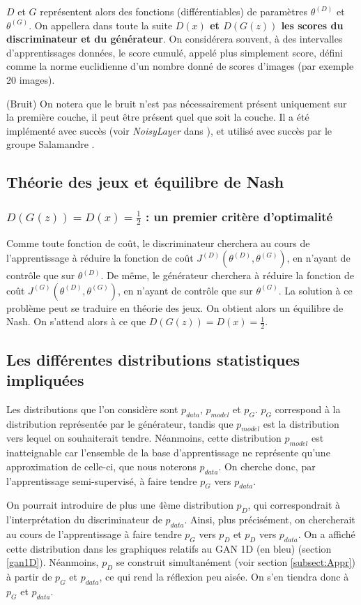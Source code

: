 $D$ et $G$ représentent alors des fonctions (différentiables) de paramètres $\theta^{(D)}$ et $\theta^{(G)}$. On appellera dans toute la suite \textbf{$D(x)$ et $D(G(z))$ les scores du discriminateur et du générateur}. On considérera souvent, à des intervalles d'apprentissages données, le score cumulé, appelé plus simplement score, défini comme la norme euclidienne d'un nombre donné de scores d'images (par exemple 20 images).\\ 

\begin{remark}(Bruit)
On notera que le bruit n'est pas nécessairement présent uniquement sur la première couche, il peut être présent quel que soit la couche. Il a été implémenté avec succès (voir \textit{NoisyLayer} dans \cite{barrios_gan_2018}), et utilisé avec succès par le groupe Salamandre \cite{bouvier_dyvoire_dessine-moi_2018}.
\end{remark}
\subsection{Théorie des jeux et équilibre de Nash}
\subsubsection{$D(G(z)) = D(x) = \frac{1}{2}$ : un premier critère d'optimalité}
Comme toute fonction de coût, le discriminateur cherchera au cours de l'apprentissage à réduire la fonction de coût $J^{(D)}(\theta^{(D)}, \theta^{(G)})$, en n'ayant de contrôle que sur $\theta^{(D)}$. De même, le générateur cherchera à réduire la fonction de coût $J^{(G)}(\theta^{(D)}, \theta^{(G)})$, en n'ayant de contrôle que sur $\theta^{(G)}$. 
La solution à ce problème peut se traduire en théorie des jeux. On obtient alors un équilibre de Nash. On s'attend alors à ce que $D(G(z)) = D(x) = \frac{1}{2}$. 

\subsection{Les différentes distributions statistiques impliquées}
Les distributions que l'on considère sont $p_{data}$, $p_{model}$ et $p_{G}$. $p_{G}$ correspond à la distribution représentée par le générateur, tandis que $p_{model}$ est la distribution vers lequel on souhaiterait tendre. Néanmoins, cette distribution $p_{model}$ est inatteignable car l'ensemble de la base d'apprentissage ne représente qu'une approximation de celle-ci, que nous noterons $p_{data}$. On cherche donc, par l'apprentissage semi-supervisé, à faire tendre $p_{G}$ vers $p_{data}$. \\
\begin{remark}
On pourrait introduire de plus une 4ème distribution $p_{D}$, qui correspondrait à l'interprétation du discriminateur de $p_{data}$. Ainsi, plus précisément, on chercherait au cours de l'apprentissage à faire tendre $p_{G}$ vers $p_{D}$ et $p_{D}$ vers $p_{data}$. On a affiché cette distribution dans les graphiques relatifs au GAN 1D (en bleu) (section \ref{gan1D}). Néanmoins, $p_{D}$ se construit simultanément (voir section \ref{subsect:Appr}) à partir de $p_{G}$ et $p_{data}$, ce qui rend la réflexion peu aisée. On s'en tiendra donc à  $p_{G}$ et $p_{data}$.
\end{remark}
